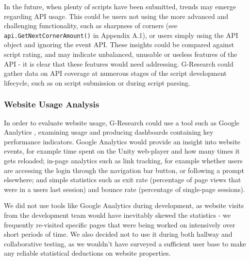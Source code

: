 In the future, when plenty of scripts have been submitted, trends may emerge regarding API usage. This could be users not using the more advanced and challenging functionality, such as sharpness of corners (see {\tt api.GetNextCornerAmount()} in Appendix A.1), or users simply using the API object and ignoring the event API. These insights could be compared against script rating, and may indicate unbalanced, unusable or useless features of the API - it is clear that these features would need addressing. G-Research could gather data on API coverage at numerous stages of the script development lifecycle, such as on script submission or during script parsing.

\subsubsection{Website Usage Analysis}

In order to evaluate website usage, G-Research could use a tool such as Google Analytics \cite{googleanalytics}, examining usage and producing dashboards containing key performance indicators. Google Analytics would provide an insight into website events, for example time spent on the Unity web-player and how many times it gets reloaded; in-page analytics such as link tracking, for example whether users are accessing the login through the navigation bar button, or following a prompt elsewhere; and simple statistics such as exit rate (percentage of page views that were in a users last session) and bounce rate (percentage of single-page sessions).

We did not use tools like Google Analytics during development, as website visits from the development team would have inevitably skewed the statistics - we frequently re-visited specific pages that were being worked on intensively over short periods of time. We also decided not to use it during both hallway and collaborative testing, as we wouldn't have surveyed a sufficient user base to make any reliable statistical deductions on website properties. 


